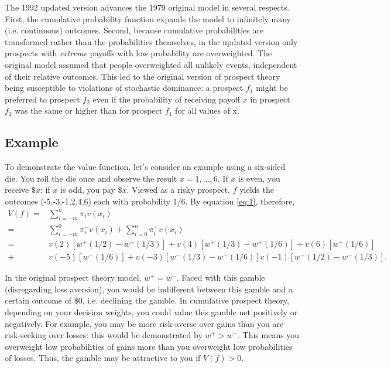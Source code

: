 \documentclass[a4paper,12pt]{article}
\numberwithin{equation}{section}
\theoremstyle{definition}
\begin{document}
\indent The 1992 updated version advances the 1979 original model in several respects. First, the cumulative probability function expands the model to infinitely many (i.e. continuous) outcomes. Second, because cumulative probabilities are transformed rather than the probabilities themselves, in the updated version  only prospects with \textit{extreme} payoffs with low probability are overweighted. The original model assumed that people overweighted all unlikely events, independent of their relative outcomes. This led to the original version of prospect theory being susceptible to violations of stochastic dominance: a prospect $f_1$ might be preferred to prospect $f_2$ even if the probability of receiving payoff $x$ in prospect $f_2$ was the same or higher than for prospect $f_1$ for all values of x.



\subsection{Example}
\indent To demonstrate the value function, let's consider an example using a six-sided die. You roll the die once and observe the result $x = 1,...,6$. If $x$ is even, you receive $\$x$; if $x$ is odd, you pay $\$x$. Viewed as a risky prospect, $f$ yields the outcomes (-5,-3,-1,2,4,6) each with probability 1/6. By equation \ref{eq:1}, therefore,
\begin{eqnarray*}
V(f) =& \sum_{i=-m}^{n}\pi_iv(x_i)\\
=& \sum_{i=-m}^{0}\pi_i^-v(x_i) + \sum_{i=0}^{n}\pi_i^+v(x_i)\\
=& v(2)[w^+(1/2) - w^+(1/3)]+v(4)[w^+(1/3) - w^+(1/6)] + v(6)[w^+(1/6)] \\
+& v(-5)[w^-(1/6)]+v(-3)[w^-(1/3) - w^-(1/6)]v(-1)[w^-(1/2) - w^-(1/3)].
\end{eqnarray*}

In the original prospect theory model, $w^+=w^-$. Faced with this gamble (disregarding loss aversion), you would be indifferent between this gamble and a certain outcome of $\$0$, i.e. declining the gamble. In cumulative prospect theory, depending on your decision weights, you could value this gamble net positively or negatively. For example, you may be more risk-averse over gains than you are risk-seeking over losses: this would be demonstrated by $w^+>w^-$. This means you overweight low probabilities of gains more than you overweight low probabilities of losses. Thus, the gamble may be attractive to you if $V(f) > 0$.
\end{document}
